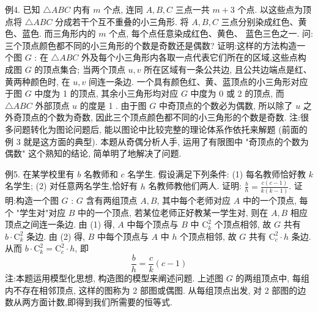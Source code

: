 例4. 已知 $\triangle A B C$ 内有 $m$ 个点, 连同 $A, B, C$ 三点一共 $m+3$ 个点.
以这些点为顶点将 $\triangle A B C$ 分成若干个互不重叠的小三角形.
将 $A, B, C$ 三点分别染成红色、黄色、蓝色.
而三角形内的 $m$ 个点, 每个点任意染成红色、黄色、 蓝色三色之一.
问: 三个顶点颜色都不同的小三角形的个数是奇数还是偶数?
证明:这样的方法构造一个图 $G$ : 在 $\triangle A B C$ 外及每个小三角形内各取一点代表它们所在的区域,这些点构成图 $G$ 的顶点集合; 当两个顶点 $u, v$ 所在区域有一条公共边, 且公共边端点是红、黄两种颜色时, 在 $u, v$ 间连一条边.
一个具有颜色红、黄、蓝顶点的小三角形对应于图 $G$ 中度为 1 的顶点, 其余小三角形均对应 $G$ 中度为 0 或 2 的顶点, 而 $\triangle A B C$ 外部顶点 $u$ 的度是 1 . 由于图 $G$ 中奇顶点的个数必为偶数, 所以除了 $u$ 之外奇顶点的个数为奇数, 因此三个顶点颜色都不同的小三角形的个数是奇数.
注:很多问题转化为图论问题后, 能以图论中比较完整的理论体系作依托来解题 (前面的例 3 就是这方面的典型). 本题从奇偶分析人手, 运用了有限图中 "奇顶点的个数为偶数" 这个熟知的结论, 简单明了地解决了问题.



例5. 在某学校里有 $b$ 名教师和 $c$ 名学生.
假设满足下列条件:
(1) 每名教师恰好教 $k$ 名学生;
(2) 对任意两名学生,恰好有 $h$ 名教师教他们两人.
证明: $\frac{b}{h}=\frac{c(c-1)}{k(k-1)}$. 
证明:构造一个图 $G$ : $G$ 含有两组顶点 $A, B$, 其中每个老师对应 $A$ 中的一个顶点, 每个 "学生对"对应 $B$ 中的一个顶点, 若某位老师正好教某一学生对, 则在 $A, B$ 相应顶点之间连一条边.
由 (1) 得, $A$ 中每个顶点与 $B$ 中 $\mathrm{C}_k^2$ 个顶点相邻, 故 $G$ 共有 $b \cdot \mathrm{C}_k^2$ 条边.
由 (2) 得, $B$ 中每个顶点与 $A$ 中 $h$ 个顶点相邻, 故 $G$ 共有 $\mathrm{C}_c^2 \cdot h$ 条边.
从而 $b \cdot \mathrm{C}_k^2=\mathrm{C}_c^2 \cdot h$, 即
$$
\frac{b}{h}=\frac{c}{k}(c-1)
$$
注:本题运用模型化思想, 构造图的模型来阐述问题.
上述图 $G$ 的两组顶点中, 每组内不存在相邻顶点, 这样的图称为 2 部图或偶图.
从每组顶点出发, 对 2 部图的边数从两方面计数,即得到我们所需要的恒等式.



